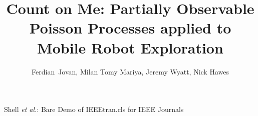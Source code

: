 \documentclass[journal]{IEEEtran}
\begin{document}
\newcommand{\tp}{\textrm{\textit{tp}}}
\newcommand{\fp}{\textrm{\textit{fp}}}
\newcommand{\tpr}{\textrm{\textit{tpr}}}
\newcommand{\fnr}{\textrm{\textit{fnr}}}
\newcommand{\fpr}{\textrm{\textit{fpr}}}
\newcommand{\tnr}{\textrm{\textit{tnr}}}
\newtheorem{definition2}[subsection]{Definition}

\title{Count on Me: Partially Observable Poisson Processes applied to Mobile Robot Exploration}

\author{Ferdian~Jovan, Milan Tomy Mariya, Jeremy Wyatt, Nick Hawes 
}

%
{Shell \MakeLowercase{\textit{et al.}}: Bare Demo of IEEEtran.cls for IEEE Journals}

\maketitle



\IEEEpeerreviewmaketitle





% 









\end{document}
